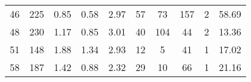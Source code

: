 \begin{tabular}{lccccccccc}
46 &      225 &                             0.85 &                             0.58 &                             2.97 &              57 &              73 &                       157 &          2 &                        58.69 \\
48 &      230 &                             1.17 &                             0.85 &                             3.01 &              40 &             104 &                        44 &          2 &                        13.36 \\
51 &      148 &                             1.88 &                             1.34 &                             2.93 &              12 &               5 &                        41 &          1 &                        17.02 \\
58 &      187 &                             1.42 &                             0.88 &                             2.32 &              29 &              10 &                        66 &          1 &                        21.16 \\
\bottomrule
\end{tabular}
